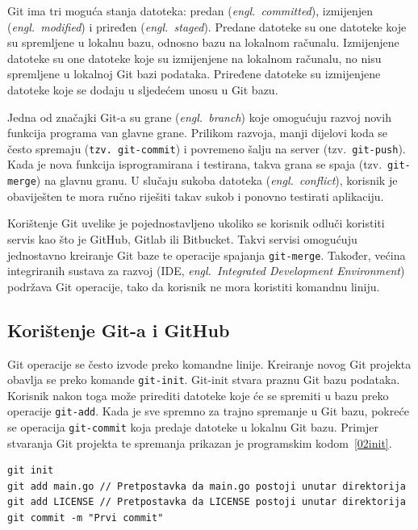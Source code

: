 Git ima tri moguća stanja datoteka: predan (\textit{engl.~committed}), izmijenjen
(\textit{engl.~modified}) i priređen (\textit{engl.~staged}). Predane datoteke su one datoteke koje
su spremljene u lokalnu bazu, odnosno bazu na lokalnom računalu. Izmijenjene datoteke su one
datoteke koje su izmijenjene na lokalnom računalu, no nisu spremljene u lokalnoj Git bazi podataka.
Priređene datoteke su izmijenjene datoteke koje se dodaju u sljedećem unosu u Git bazu.

Jedna od značajki Git-a su grane (\textit{engl.~branch}) koje omogućuju razvoj novih funkcija
programa van glavne grane. Prilikom razvoja, manji dijelovi koda se često spremaju (\texttt{tzv.
git-commit}) i povremeno šalju na server (tzv.~\texttt{git-push}). Kada je nova funkcija
isprogramirana i testirana, takva grana se spaja (tzv.~\texttt{git-merge}) na glavnu granu. U
slučaju sukoba datoteka (\textit{engl.~conflict}), korisnik je obaviješten te mora ručno riješiti
takav sukob i ponovno testirati aplikaciju.

Korištenje Git uvelike je pojednostavljeno ukoliko se korisnik odluči koristiti servis kao što je
GitHub, Gitlab ili Bitbucket. Takvi servisi omogućuju jednostavno kreiranje Git baze te operacije
spajanja \texttt{git-merge}. Također, većina integriranih sustava za razvoj (IDE,
\textit{engl.~Integrated Development Environment}) podržava Git operacije, tako da korisnik ne mora
koristiti komandnu liniju.

\subsection{Korištenje Git-a i GitHub} Git operacije se često izvode preko komandne linije.
Kreiranje novog Git projekta obavlja se preko komande \texttt{git-init}. Git-init stvara praznu Git
bazu podataka. Korisnik nakon toga može prirediti datoteke koje će se spremiti u bazu preko
operacije \texttt{git-add}. Kada je sve spremno za trajno spremanje u Git bazu, pokreće se operacija
\texttt{git-commit} koja predaje datoteke u lokalnu Git bazu. Primjer stvaranja Git projekta te
spremanja prikazan je programskim kodom~\ref{02init}.

\begin{lstlisting}[float=h]
git init
git add main.go // Pretpostavka da main.go postoji unutar direktorija
git add LICENSE // Pretpostavka da LICENSE postoji unutar direktorija
git commit -m "Prvi commit"
\end{lstlisting}

